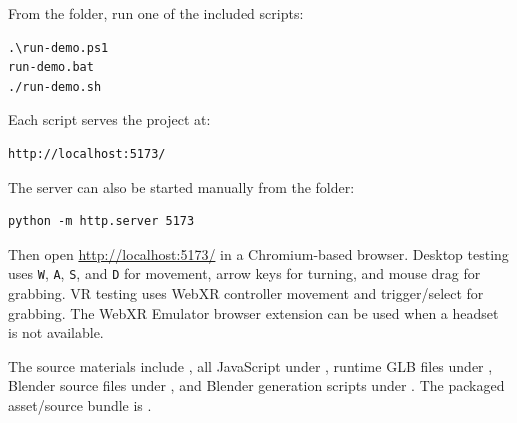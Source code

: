 \documentclass[conference]{IEEEtran}
\begin{document}
From the  folder, run one of the included scripts:

\begin{verbatim}
.\run-demo.ps1
run-demo.bat
./run-demo.sh
\end{verbatim}

Each script serves the project at:

\begin{verbatim}
http://localhost:5173/
\end{verbatim}

The server can also be started manually from the  folder:

\begin{verbatim}
python -m http.server 5173
\end{verbatim}

Then open \url{http://localhost:5173/} in a Chromium-based browser. Desktop
testing uses \texttt{W}, \texttt{A}, \texttt{S}, and \texttt{D} for movement,
arrow keys for turning, and mouse drag for grabbing. VR testing uses WebXR
controller movement and trigger/select for grabbing. The WebXR Emulator browser
extension can be used when a headset is not available.

The source materials include , all JavaScript under
, runtime GLB files under ,
Blender source files under , and Blender generation
scripts under . The packaged asset/source bundle is
.

\nocite{three,webxr,cannon,blender}


\end{document}
